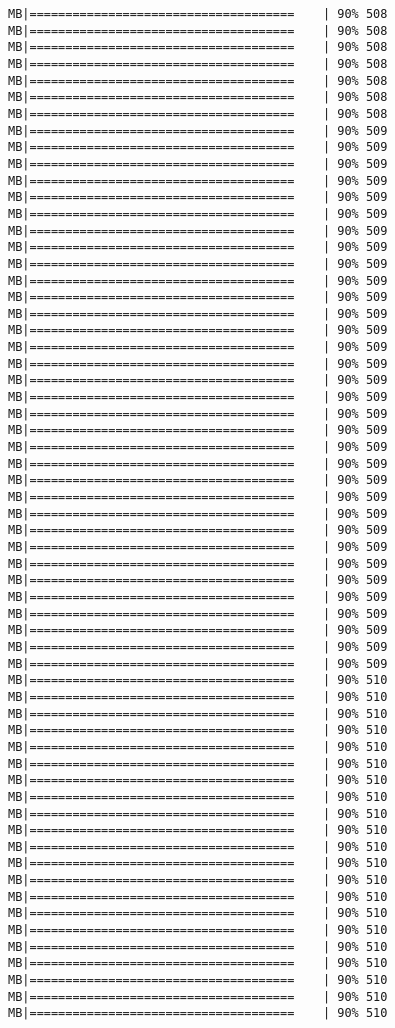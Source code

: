 \documentclass[
]{article}
\begin{document}
\begin{verbatim}
MB|=====================================    | 90% 508 MB|=====================================    | 90% 508 MB|=====================================    | 90% 508 MB|=====================================    | 90% 508 MB|=====================================    | 90% 508 MB|=====================================    | 90% 508 MB|=====================================    | 90% 508 MB|=====================================    | 90% 509 MB|=====================================    | 90% 509 MB|=====================================    | 90% 509 MB|=====================================    | 90% 509 MB|=====================================    | 90% 509 MB|=====================================    | 90% 509 MB|=====================================    | 90% 509 MB|=====================================    | 90% 509 MB|=====================================    | 90% 509 MB|=====================================    | 90% 509 MB|=====================================    | 90% 509 MB|=====================================    | 90% 509 MB|=====================================    | 90% 509 MB|=====================================    | 90% 509 MB|=====================================    | 90% 509 MB|=====================================    | 90% 509 MB|=====================================    | 90% 509 MB|=====================================    | 90% 509 MB|=====================================    | 90% 509 MB|=====================================    | 90% 509 MB|=====================================    | 90% 509 MB|=====================================    | 90% 509 MB|=====================================    | 90% 509 MB|=====================================    | 90% 509 MB|=====================================    | 90% 509 MB|=====================================    | 90% 509 MB|=====================================    | 90% 509 MB|=====================================    | 90% 509 MB|=====================================    | 90% 509 MB|=====================================    | 90% 509 MB|=====================================    | 90% 509 MB|=====================================    | 90% 509 MB|=====================================    | 90% 509 MB|=====================================    | 90% 510 MB|=====================================    | 90% 510 MB|=====================================    | 90% 510 MB|=====================================    | 90% 510 MB|=====================================    | 90% 510 MB|=====================================    | 90% 510 MB|=====================================    | 90% 510 MB|=====================================    | 90% 510 MB|=====================================    | 90% 510 MB|=====================================    | 90% 510 MB|=====================================    | 90% 510 MB|=====================================    | 90% 510 MB|=====================================    | 90% 510 MB|=====================================    | 90% 510 MB|=====================================    | 90% 510 MB|=====================================    | 90% 510 MB|=====================================    | 90% 510 MB|=====================================    | 90% 510 MB|=====================================    | 90% 510 MB|=====================================    | 90% 510 MB|=====================================    | 90% 510 
\end{verbatim}
\end{document}

